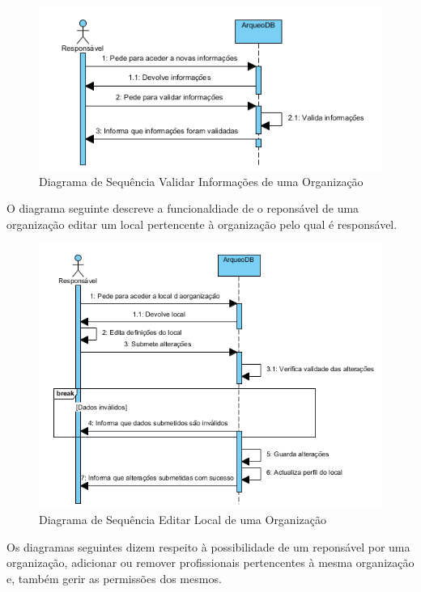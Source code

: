 \documentclass[12pt,a4paper]{article}
\begin{document}
\begin{figure}[h!]
\centering
\includegraphics[scale=1]{sequencia/validarinf}
\caption{Diagrama de Sequência Validar Informações de uma Organização}  
\end{figure}


\clearpage
O diagrama seguinte descreve a funcionaldiade de o reponsável de uma organização editar um local pertencente à organização pelo qual é responsável.\\

\begin{figure}[h!]
\centering
\includegraphics[scale=1]{sequencia/editarlocal}
\caption{Diagrama de Sequência Editar Local de uma Organização}  
\end{figure}

\clearpage
Os diagramas seguintes dizem respeito à possibilidade de um reponsável por uma organização, adicionar ou remover profissionais pertencentes à mesma organização e, também gerir as permissões dos mesmos.\\
\end{document}
